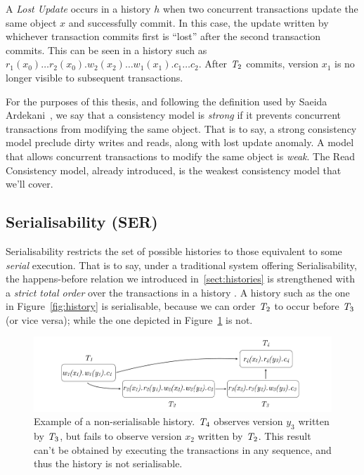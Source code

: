 \begin{definition}
A \emph{Lost Update} occurs in a history $h$ when two concurrent transactions update the same object $x$ and successfully commit. In this case, the update written by whichever transaction commits first is ``lost'' after the second transaction commits. This can be seen in a history such as $r_1(x_0)\ldots r_2(x_0).w_2(x_2) \ldots w_1(x_1).c_1\ldots c_2$. After $\mathit{T}_2$ commits, version $x_1$ is no longer visible to subsequent transactions.
\end{definition}

For the purposes of this thesis, and following the definition used by Saeida Ardekani~\citep{ardekani_thesis}, we say that a consistency model is \emph{strong} if it prevents concurrent transactions from modifying the same object. That is to say, a strong consistency model preclude dirty writes and reads, along with lost update anomaly. A model that allows concurrent transactions to modify the same object is \emph{weak}. The Read Consistency model, already introduced, is the weakest consistency model that we'll cover.

\subsection{Serialisability (SER)}
\label{sect:ser}

Serialisability restricts the set of possible histories to those equivalent to some \emph{serial} execution. That is to say, under a traditional system offering Serialisability, the happens-before relation we introduced in~\ref{sect:histories} is strengthened with a \emph{strict total order} over the transactions in a history . A history such as the one in Figure~\ref{fig:history} is serialisable, because we can order $\mathit{T}_2$ to occur before $\mathit{T}_3$ (or vice versa); while the one depicted in Figure~\ref{fig:non_ser_history} is not.

\begin{figure}[h]
  \centering
  \vspace{-0.3cm}
  \includegraphics[width=\textwidth]{figures/non_ser_hist.pdf}
  \vspace{-1cm}
  \caption{Example of a non-serialisable history. $\mathit{T}_4$ observes version $y_3$ written by $\mathit{T}_3$, but fails to observe version $x_2$ written by $\mathit{T}_2$. This result can't be obtained by executing the transactions in any sequence, and thus the history is not serialisable.}
  \label{fig:non_ser_history}
\end{figure}

